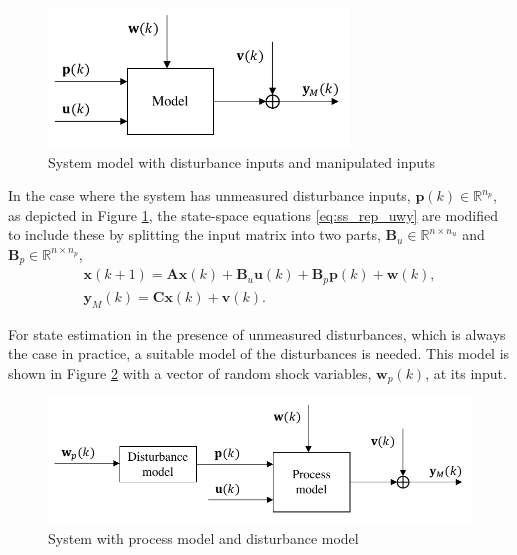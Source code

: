 {\begin{figure}[ht]
	\centering
	\includegraphics[width=8cm]{images/model_diag_upwvy.pdf}
	\caption{System model with disturbance inputs and manipulated inputs}
	\label{fig:model_diag_upwvy}
\end{figure}
In the case where the system has unmeasured disturbance inputs, $\mathbf{p}(k) \in \mathbb{R}^{n_p}$, as depicted in Figure \ref{fig:model_diag_upwvy}, the state-space equations \eqref{eq:ss_rep_uwy} are modified to include these by splitting the input matrix into two parts, $\mathbf{B}_u \in \mathbb{R}^{n \times n_u}$ and $\mathbf{B}_p \in \mathbb{R}^{n \times n_p}$,
\begin{equation} \label{eq:ss_rep_upwy}
	\begin{aligned}
		\mathbf{x}(k+1) = \mathbf{A} \mathbf{x}(k) + \mathbf{B}_u \mathbf{u}(k) + \mathbf{B}_p \mathbf{p}(k) + \mathbf{w}(k), \\
		\mathbf{y}_M(k) = \mathbf{C} \mathbf{x}(k) + \mathbf{v}(k).
	\end{aligned}
\end{equation}

For state estimation in the presence of unmeasured disturbances, which is always the case in practice, a suitable model of the disturbances is needed. This model is shown in Figure \ref{fig:model_diag_wpupwvy} with a vector of random shock variables, $\mathbf{w}_p(k)$, at its input.
%
\begin{figure}[ht]
	\centering
	\includegraphics[width=12.5cm]{images/model_diag_wpupwvy.pdf}
	\caption{System with process model and disturbance model}
	\label{fig:model_diag_wpupwvy}
\end{figure}

}
